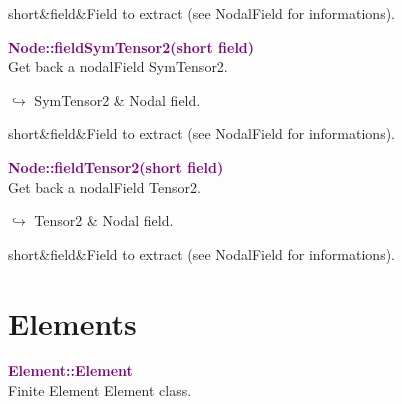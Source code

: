 \begin{tcolorbox}[width=\textwidth,myArgs,tabularx={ll|R}]
short&field&Field to extract (see NodalField for informations).
\end{tcolorbox}



\textcolor{purple}{\textbf{Node::fieldSymTensor2(short field)}}\label{Node::fieldSymTensor2(short field)}\\
Get back a nodalField SymTensor2.\vspace*{-0.5em}
\begin{tcolorbox}[grow to left by=-1cm, width=\textwidth-1cm,myArgs,tabularx={l|R}]
$\hookrightarrow$ SymTensor2 & Nodal field.
\end{tcolorbox}

\begin{tcolorbox}[width=\textwidth,myArgs,tabularx={ll|R}]
short&field&Field to extract (see NodalField for informations).
\end{tcolorbox}


\textcolor{purple}{\textbf{Node::fieldTensor2(short field)}}\label{Node::fieldTensor2(short field)}\\
Get back a nodalField Tensor2.\vspace*{-0.5em}
\begin{tcolorbox}[grow to left by=-1cm, width=\textwidth-1cm,myArgs,tabularx={l|R}]
$\hookrightarrow$ Tensor2 & Nodal field.
\end{tcolorbox}

\begin{tcolorbox}[width=\textwidth,myArgs,tabularx={ll|R}]
short&field&Field to extract (see NodalField for informations).
\end{tcolorbox}


\section{Elements}

\textcolor{purple}{\textbf{Element::Element}}\label{Element::Element}\\
Finite Element Element class.

